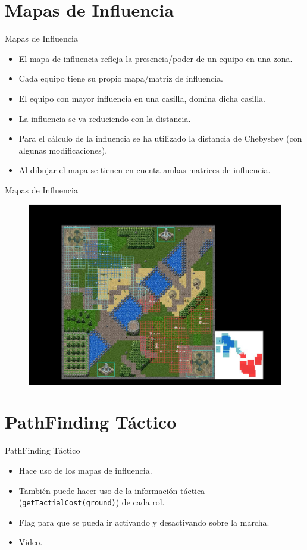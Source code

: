 \documentclass[10pt]{beamer}
\begin{document}
\section{Mapas de Influencia}
\begin{frame}{Mapas de Influencia}
\begin{itemize}[<+- | alert@+>]
	\item El mapa de influencia refleja la presencia/poder de un equipo en una zona.
	\item Cada equipo tiene su propio mapa/matriz de influencia.
	\item El equipo con mayor influencia en una casilla, domina dicha casilla.
	\item La influencia se va reduciendo con la distancia.
	\item Para el cálculo de la influencia se ha utilizado la distancia de Chebyshev (con algunas modificaciones).
	\item Al dibujar el mapa se tienen en cuenta ambas matrices de influencia.
\end{itemize}
\end{frame}

\begin{frame}{Mapas de Influencia}
\begin{figure}[!th]
	\includegraphics[scale=0.4]{images/influencia}
\end{figure}
\end{frame}

\section{PathFinding Táctico}
\begin{frame}{PathFinding Táctico}
\begin{itemize}[<+- | alert@+>]
	\item Hace uso de los mapas de influencia.
	\item También puede hacer uso de la información táctica (\texttt{getTactialCost(ground)}) de cada rol.
	\item Flag para que se pueda ir activando y desactivando sobre la marcha.
	\item Video.
\end{itemize}
\end{frame}
\end{document}

